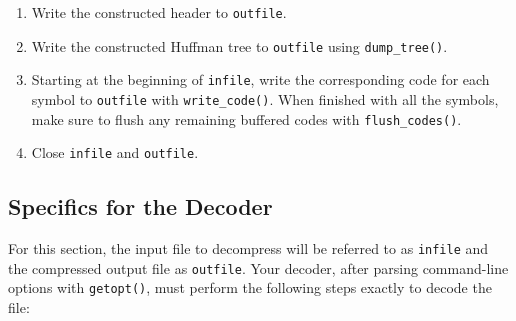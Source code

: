 \begin{enumerate}
  \item Write the constructed header to \texttt{outfile}.

  \item Write the constructed Huffman tree to \texttt{outfile} using
    \texttt{dump\_tree()}.

  \item Starting at the beginning of \texttt{infile}, write the
    corresponding code for each symbol to \texttt{outfile} with
    \texttt{write\_code()}. When finished with all the symbols, make
    sure to flush any remaining buffered codes with
    \texttt{flush\_codes()}.

  \item Close \texttt{infile} and \texttt{outfile}.
\end{enumerate}

\subsection{Specifics for the Decoder}\label{decoder_specifics}

For this section, the input file to decompress will be referred to as
\texttt{infile} and the compressed output file as \texttt{outfile}. Your
decoder, after parsing command-line options with \texttt{getopt()}, must
perform the following steps exactly to decode the file:

